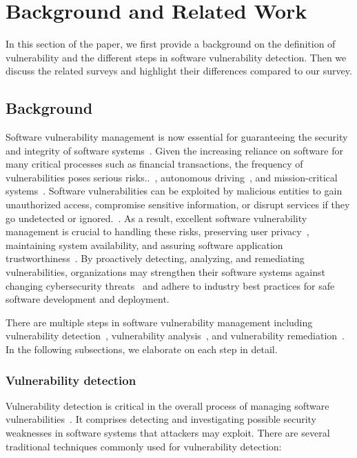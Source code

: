\section{Background and Related Work}
\label{related}

In this section of the paper, we first provide a background on the definition of vulnerability and the different steps in software vulnerability detection. Then we discuss the related surveys and highlight their differences compared to our survey.

\subsection{Background}

Software vulnerability management is now essential for guaranteeing the security and integrity of software systems~\cite{chang2011trend, foreman2019vulnerability, raza2022threat, walkowski2021vulnerability}. Given the increasing reliance on software for many critical processes such as financial transactions, the frequency of vulnerabilities poses serious risks..~\cite{lu2021neucheck, he2020smart}, autonomous driving~\cite{gao2021autonomous, luo2019localization}, and mission-critical systems~\cite{goseva2017experience, harzevili2022characterizing}. Software vulnerabilities can be exploited by malicious entities to gain unauthorized access, compromise sensitive information, or disrupt services if they go undetected or ignored.~\cite{harzevili2022characterizing}. As a result, excellent software vulnerability management is crucial to handling these risks, preserving user privacy~\cite{anthonysamy2017privacy}, maintaining system availability, and assuring software application trustworthiness~\cite{medeiros2023trustworthiness}. By proactively detecting, analyzing, and remediating vulnerabilities, organizations may strengthen their software systems against changing cybersecurity threats~\cite{aslan2023comprehensive} and adhere to industry best practices for safe software development and deployment.


There are multiple steps in software vulnerability management including vulnerability detection~\cite{cao2022mvd}, vulnerability analysis~\cite{kudjo2020effect}, and vulnerability remediation~\cite{le2021survey}. In the following subsections, we elaborate on each step in detail.

\subsubsection{Vulnerability detection}
Vulnerability detection is critical in the overall process of managing software vulnerabilities~\cite{cao2022mvd, jeon2021autovas,
 tian2020bvdetector,
 liu2020cd,
 wang2020combining,
 cheng2021deepwukong,
 zou2019mu,
 cao2022mvd,
 ziems2021security,
 lin2019software,
 li2021sysevr}. It comprises detecting and investigating possible security weaknesses in software systems that attackers may exploit. There are several traditional techniques commonly used for vulnerability detection:

